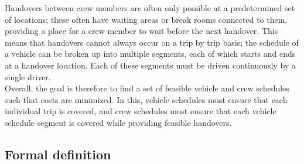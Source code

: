 \documentclass[]{article}
\begin{document}
Handovers between crew members are often only possible at a predetermined set of locations; these often have waiting areas or break rooms connected to them, providing a place for a crew member to wait before the next handover. This means that handovers cannot always occur on a trip by trip basis; the schedule of a vehicle can be broken up into multiple segments, each of which starts and ends at a handover location. Each of these segments must be driven continuously by a single driver. \\
Overall, the goal is therefore to find a set of feasible vehicle and crew schedules such that costs are minimized. In this, vehicle schedules must ensure that each individual trip is covered, and crew schedules must ensure that each vehicle schedule segment is covered while providing feasible handovers. \\

\subsection{Formal definition}
\end{document}
